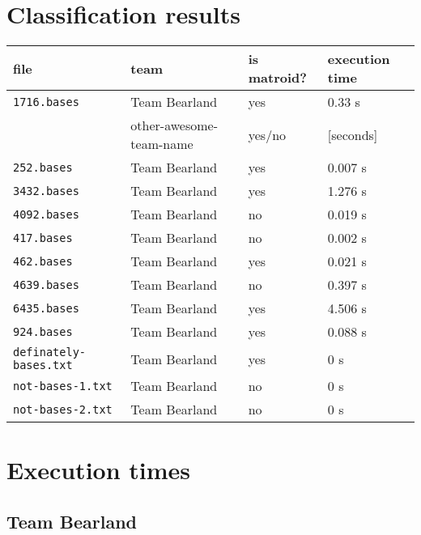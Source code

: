 \documentclass[11pt]{amsart}
\begin{document}
\section{Classification results}

\begin{center}
  \begin{tabular}[c]{llll}
    file
    & team
    & is matroid?
    & execution time
    \\\hline
    \texttt{1716.bases}
    & Team Bearland
    & yes
    & 0.33 s
    \\
    & other-awesome-team-name
    & yes/no
    & [seconds]
    \\\hline
      \texttt{252.bases}
    & Team Bearland
    & yes
    & 0.007 s
    \\\hline
      \texttt{3432.bases}
    & Team Bearland
    & yes
    & 1.276 s
    \\\hline
      \texttt{4092.bases}
    & Team Bearland
    & no
    & 0.019 s
    \\\hline
      \texttt{417.bases}
    & Team Bearland
    & no
    & 0.002 s
    \\\hline
      \texttt{462.bases}
    & Team Bearland
    & yes
    & 0.021 s
    \\\hline
      \texttt{4639.bases}
    & Team Bearland
    & no
    & 0.397 s
    \\\hline
    \texttt{6435.bases}
    & Team Bearland
    & yes
    & 4.506 s
    \\\hline
    \texttt{924.bases}
    & Team Bearland
    & yes
    & 0.088 s
    \\\hline
    \texttt{definately-bases.txt}
    & Team Bearland
    & yes
    & 0 s
    \\\hline
    \texttt{not-bases-1.txt}
    & Team Bearland
    & no
    & 0 s
    \\\hline
    \texttt{not-bases-2.txt}
    & Team Bearland
    & no
    & 0 s
    \\\hline
  \end{tabular}
\end{center}

\section{Execution times}

\subsection{Team Bearland}
\end{document}
